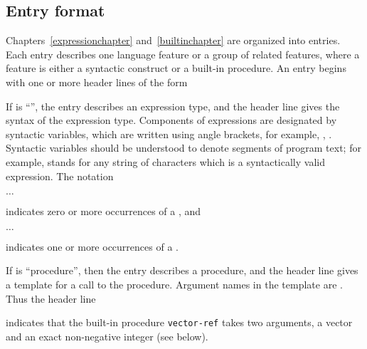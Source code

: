 


\subsection{Entry format}

Chapters~\ref{expressionchapter} and~\ref{builtinchapter} are organized
into entries.  Each entry describes one language feature or a group of
related features, where a feature is either a syntactic construct or a
built-in procedure.  An entry begins with one or more header lines of the form

\noindent{}\unpenalty

If  is ``\exprtype'', the entry describes an expression
type, and the header line gives the syntax of the expression type.
Components of expressions are designated by syntactic variables, which
are written using angle brackets, for example, ,
.  Syntactic variables should be understood to denote segments of
program text; for example,  stands for any string of
characters which is a syntactically valid expression.  The notation
\begin{tabbing}
\qquad {} $\ldots$
\end{tabbing}
indicates zero or more occurrences of a , and
\begin{tabbing}
\qquad {}  $\ldots$
\end{tabbing}
indicates one or more occurrences of a .

If  is ``procedure'', then the entry describes a procedure, and
the header line gives a template for a call to the procedure.  Argument
names in the template are .  Thus the header line

\noindent{}\unpenalty

indicates that the built-in procedure {\tt vector-ref} takes
two arguments, a vector  and an exact non-negative integer
 (see below).

